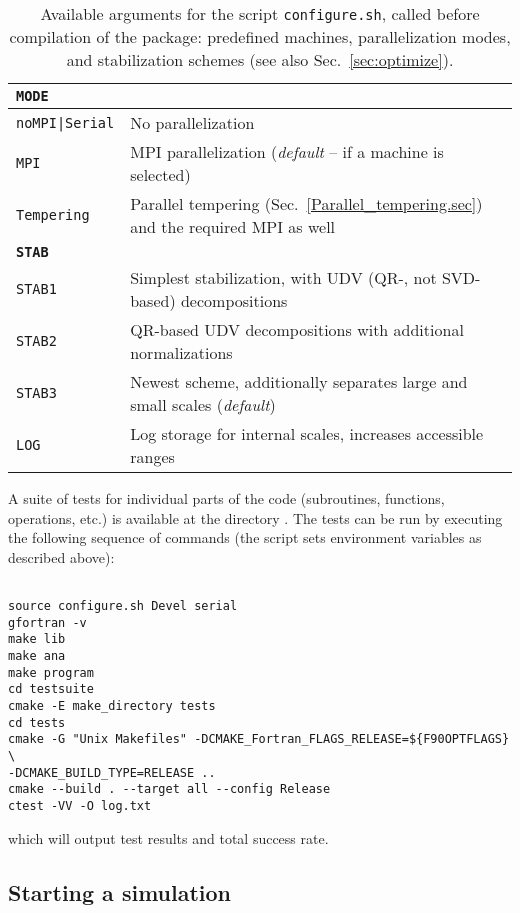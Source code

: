 \begin{table}[!ht]
\begin{center}
\begin{tabular}{@{} p{} p{} @{}}
			\textbf{\texttt{MODE}} &  \\\midrule
			\texttt{noMPI|Serial}  &  No parallelization \\
			\texttt{MPI}  &  MPI parallelization (\emph{default} -- if a machine is selected) \\
			\texttt{Tempering}  &  Parallel tempering (Sec.~\ref{Parallel_tempering.sec}) and the required MPI as well \vspace{7pt}\\ 
			
			\textbf{\texttt{STAB}} &  \\\midrule
			\texttt{STAB1}  &  Simplest stabilization, with UDV (QR-, not SVD-based) decompositions\\
			\texttt{STAB2}  &  QR-based UDV decompositions with additional normalizations\\
			\texttt{STAB3}  &  Newest scheme, additionally separates large and small scales (\emph{default})\\
			\texttt{LOG}  &  Log storage for internal scales, increases accessible ranges\\\bottomrule
		\end{tabular}
		\caption{Available arguments for the script \texttt{configure.sh}, called before compilation of the package: predefined machines, parallelization modes, and stabilization schemes (see also Sec.~\ref{sec:optimize}).} \label{table:configureHPC}
	\end{center}
\end{table}

A suite of tests for individual parts of the code (subroutines, functions, operations, etc.) is available at the directory . The tests can be run by executing the following sequence of commands (the script  sets environment variables as described above):
\begin{lstlisting}[style=bash,morekeywords={make,cmake,ctest}]

source configure.sh Devel serial
gfortran -v
make lib
make ana
make program
cd testsuite
cmake -E make_directory tests
cd tests
cmake -G "Unix Makefiles" -DCMAKE_Fortran_FLAGS_RELEASE=${F90OPTFLAGS} \
-DCMAKE_BUILD_TYPE=RELEASE ..
cmake --build . --target all --config Release
ctest -VV -O log.txt
\end{lstlisting}
which will output test results and total success rate.

%
\subsection*{Starting a simulation}
%

